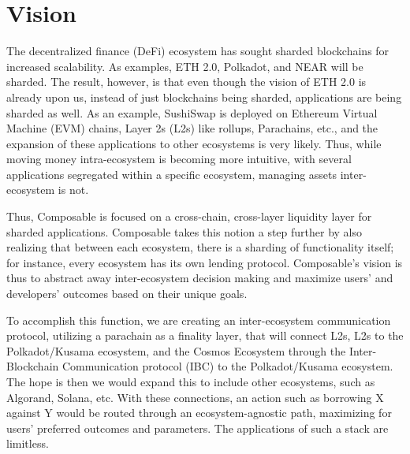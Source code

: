 \section{Vision}

The decentralized finance (DeFi) ecosystem has sought sharded blockchains for increased scalability. As examples, ETH 2.0, Polkadot, and NEAR will be sharded. The result, however, is that even though the vision of ETH 2.0 is already upon us, instead of just blockchains being sharded, applications are being sharded as well. As an example, SushiSwap is deployed on Ethereum Virtual Machine (EVM) chains, Layer 2s (L2s) like rollups, Parachains, etc., and the expansion of these applications to other ecosystems is very likely. Thus, while moving money intra-ecosystem is becoming more intuitive, with several applications segregated within a specific ecosystem, managing assets inter-ecosystem is not.

Thus, Composable is focused on a cross-chain, cross-layer liquidity layer for sharded applications. Composable takes this notion a step further by also realizing that between each ecosystem, there is a sharding of functionality itself; for instance, every ecosystem has its own lending protocol. Composable’s vision is thus to abstract away inter-ecosystem decision making and maximize users’ and developers’ outcomes based on their unique goals.

To accomplish this function, we are creating an inter-ecosystem communication protocol, utilizing a parachain as a finality layer, that will connect L2s, L2s to the Polkadot/Kusama ecosystem, and the Cosmos Ecosystem through the Inter-Blockchain Communication protocol (IBC) to the Polkadot/Kusama ecosystem. The hope is then we would expand this to include other ecosystems, such as Algorand, Solana, etc. With these connections, an action such as borrowing X against Y would be routed through an ecosystem-agnostic path, maximizing for users’ preferred outcomes and parameters. The applications of such a stack are limitless.
